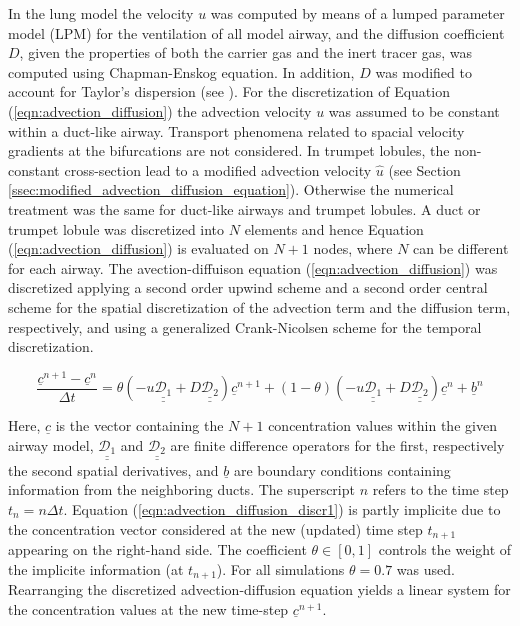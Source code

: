 In the lung model the velocity $u$ was computed by means of a lumped parameter model (LPM) for the ventilation of all model airway, and the diffusion coefficient $D$, given the properties of both the carrier gas and the inert tracer gas, was computed using Chapman-Enskog equation.
In addition, $D$ was modified to account for Taylor's dispersion (see \cite{Cussler2009}).
For the discretization of Equation (\ref{eqn:advection_diffusion}) the advection velocity $u$ was assumed to be constant within a duct-like airway.
Transport phenomena related to spacial velocity gradients at the bifurcations are not considered.
In trumpet lobules, the non-constant cross-section lead to a modified advection velocity $\hat{u}$ (see Section \ref{ssec:modified_advection_diffusion_equation}).
Otherwise the numerical treatment was the same for duct-like airways and trumpet lobules.
A duct or trumpet lobule was discretized into $N$ elements and hence Equation (\ref{eqn:advection_diffusion}) is evaluated on $N+1$ nodes, where $N$ can be different for each airway.
The avection-diffuison equation (\ref{eqn:advection_diffusion}) was discretized applying a second order upwind scheme and a second order central scheme for the spatial discretization of the advection term and the diffusion term, respectively, and using a generalized Crank-Nicolsen scheme for the temporal discretization.

\begin{equation} \label{eqn:advection_diffusion_discr1}
\frac{\underline{c}^{n+1} - \underline{c}^{n}}{\Delta t} = \theta(-u\underline{\underline{\mathcal{D}_1}} + D \underline{\underline{\mathcal{D}_2}})\underline{c}^{n+1} + (1 - \theta)(-u\underline{\underline{\mathcal{D}_1}} + D \underline{\underline{\mathcal{D}_2}})\underline{c}^{n} + \underline{b}^n
\end{equation}

Here, $\underline{c}$ is the vector containing the $N+1$ concentration values within the given airway model, $\underline{\underline{\mathcal{D}_1}}$ and $\underline{\underline{\mathcal{D}_2}}$ are finite difference operators for the first, respectively the second spatial derivatives, and $\underline{b}$ are boundary conditions containing information from the neighboring ducts.
The superscript $n$ refers to the time step $t_n = n \Delta t$.
Equation (\ref{eqn:advection_diffusion_discr1}) is partly implicite due to the concentration vector considered at the new (updated) time step  $t_{n+1}$ appearing on the right-hand side.
The coefficient $\theta \in [0, 1]$ controls the weight of the implicite information (at $t_{n+1}$).
For all simulations $\theta = 0.7$ was used.
Rearranging the discretized advection-diffusion equation yields a linear system for the concentration values at the new time-step $\underline{c}^{n+1}$.

